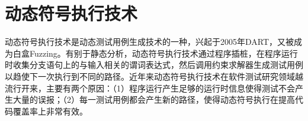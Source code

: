\section{动态符号执行技术}

动态符号执行技术是动态测试用例生成技术的一种，兴起于2005年DART，又被成为白盒Fuzzing。有别于静态分析，动态符号执行技术通过程序插桩，在程序运行时收集分支语句上的与输入相关的谓词表达式，然后调用约束求解器生成测试用例以趋使下一次执行到不同的路径。近年来动态符号执行技术在软件测试研究领域越流行开来，主要有两个原因：（1）程序运行产生足够的运行时信息使得测试不会产生大量的误报；（2）每一测试用例都会产生新的路径，使得动态符号执行在提高代码覆盖率上非常有效。



%

